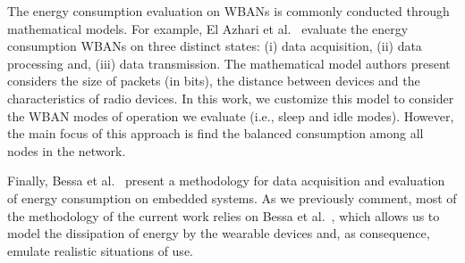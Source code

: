 
The energy consumption evaluation on WBANs is commonly conducted through mathematical models. For example, El Azhari et al.~\cite{el2017equalized} evaluate the energy consumption WBANs on three distinct states: (i) data acquisition, (ii) data processing and, (iii) data transmission. The mathematical model authors present considers the size of packets (in bits), the distance between devices and the characteristics of radio devices. In this work, we customize this model to consider the WBAN modes of operation we evaluate (i.e., sleep and idle modes).  However, the main focus of this approach is find the balanced consumption among all nodes in the network.


Finally, Bessa et al.~\cite{bessa2017jetsonleap} present a methodology for data acquisition and evaluation of energy consumption on embedded systems. As we previously comment, most of the methodology of the current work relies on Bessa et al.~\cite{bessa2017jetsonleap}, which allows us to model the dissipation of energy by the wearable devices and, as consequence, emulate realistic situations of use.
